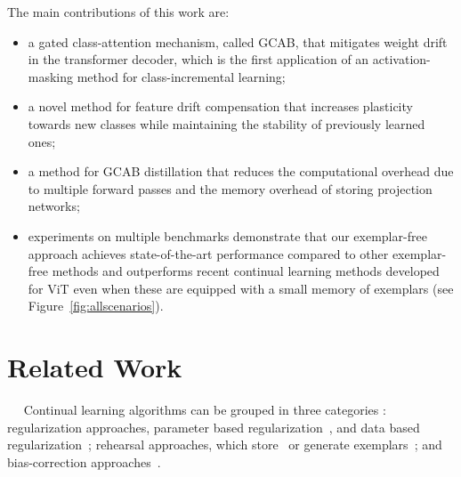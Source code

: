 \documentclass[twocolumn]{svjour3}          %
\newcommand{\minisection}[1]{\vspace{0.04in} \noindent {\bf #1}\ \ }
\begin{document}
The main contributions of this work are:
\begin{itemize}
    \item a gated class-attention mechanism, called GCAB, that mitigates weight drift in the transformer decoder, which is the first application of an activation-masking method for class-incremental learning; 
    \item a novel method for feature drift compensation that increases plasticity towards new classes while maintaining the stability of previously learned ones;
    \item a method for GCAB distillation that reduces the computational overhead due to multiple forward passes and the memory overhead of storing projection networks;
    \item experiments on multiple benchmarks demonstrate that our exemplar-free approach achieves state-of-the-art performance compared to other exemplar-free methods and outperforms recent continual learning methods developed for ViT even when these are equipped with a small memory of exemplars (see Figure~\ref{fig:allscenarios}).
\end{itemize}


\section{Related Work}

\minisection{Continual Learning.} Continual learning algorithms can be grouped in three categories \citep{delange2021continual}: regularization approaches, parameter based regularization~\citep{kirkpatrick2017overcoming, lee2020continual,liu2018rotate,zenke2017continual}, and data based regularization~\citep{castro2018end, dhar2019learning, hou2019learning,jung2016less,li2017learning,  wu2019large,zhang2020class}; rehearsal approaches, which store~\citep{chaudhry2018riemannian,rebuffi2017icarl} or generate exemplars~\citep{wang2021ordisco,zhai2021hyper}; and bias-correction approaches~\citep{castro2018end,hou2019learning,wu2019large}. 
\end{document}
